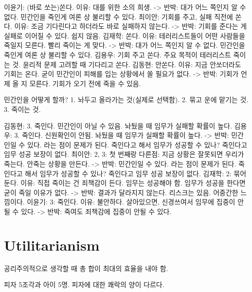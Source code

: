 \begin{solution}
  이윤기: (바로 쏘는)쏜다. 이유: 대를 위한 소의 희생.
  -> 반박: 대가 어느 쪽인지 알 수 없다. 민간인을 죽인게 여론 상 불리할 수 있다.
  최이안: 기회를 주고, 실패 직전에 쏜다. 이유: 조금 기다린다고 하더라도 바로 실패하지 않는다.
  -> 반박: 기회를 준다는 게 실패로 이어질 수 있다. 쉽지 않음.
  김재학: 쏜다. 이유: 테러리스트들이 어떤 사람들을 죽일지 모른다. 빨리 죽이는 게 맞다.
  -> 반박: 대가 어느 쪽인지 알 수 없다. 민간인을 죽인게 여론 상 불리할 수 있다.
  김용우: 기회 주고 쏜다. 주요 목적이 테러리스트 죽이는 것. 윤리적 문제 고려할 때 기다리고 쏜다.
  김동현: 안쏜다. 이유: 지금 안쏘더라도 기회는 온다. 굳이 민간인이 피해를 입는 상황에서 쏠 필요가 없다.
  -> 반박: 기회가 언제 올 지 모른다. 기회가 오기 전에 죽을 수 있음.
\end{solution}

\begin{exercise}
  민간인을 어떻게 할까? 1. 놔두고 올라가는 것(실제로 선택함). 2. 묶고 운에 맡기는 것. 3. 죽이는 것.
\end{exercise}

\begin{solution}
  김동현: 3. 죽인다. 민간인이 아닐 수 있음. 놔뒀을 때 임무가 실패할 확률이 높다.
  김용우: 3. 죽인다. 신원확인이 안됨. 놔뒀을 때 임무가 실패할 확률이 높다.
  -> 반박: 민간인일 수 있다. 라는 점이 문제가 된다. 죽인다고 해서 임무가 성공할 수 있나?
  죽인다고 임무 성공 보장이 없다.
  최이안: 2, 3: 첫 번째랑 다른점: 지금 상황은 잘못되면 우리가 죽는다. 안죽는 상황을 만든다.
  -> 반박: 민간인일 수 있다. 라는 점이 문제가 된다. 죽인다고 해서 임무가 성공할 수 있나?
  죽인다고 임무 성공 보장이 없다.
  김재학: 2: 묶어둔다. 이유: 직접 죽이는 건 죄책감이 든다. 임무는 성공해야 함. 임무가 성공을 한다면 굳이 죽일 이유가 없다.
  -> 반박: 결과가 달라지지 않는다. 리스크는 있음. 어중간한 느낌이다.
  이윤기: 3: 죽인다. 이유: 불안하다. 살아있으면, 신경쓰여서 임무에 집중이 안될 수 있다.
  -> 반박: 죽여도 죄책감에 집중이 안될 수 있다.
\end{solution}

\section{Utilitarianism}

공리주의적으로 생각할 때 총 합이 최대의 효율을 내야 함.

피자 5조각과 아이 5명. 피자에 대한 쾌락의 양이 다르다.

